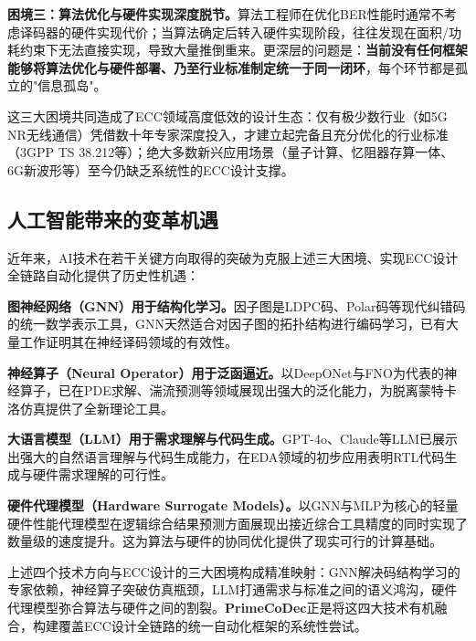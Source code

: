 \textbf{困境三：算法优化与硬件实现深度脱节。}算法工程师在优化BER性能时通常不考虑译码器的硬件实现代价；当算法确定后转入硬件实现阶段，往往发现在面积/功耗约束下无法直接实现，导致大量推倒重来。更深层的问题是：\textbf{当前没有任何框架能够将算法优化与硬件部署、乃至行业标准制定统一于同一闭环}，每个环节都是孤立的"信息孤岛"。

这三大困境共同造成了ECC领域高度低效的设计生态：仅有极少数行业（如5G NR无线通信）凭借数十年专家深度投入，才建立起完备且充分优化的行业标准（3GPP TS 38.212等\cite{3gpp38212}）；绝大多数新兴应用场景（量子计算、忆阻器存算一体、6G新波形等）至今仍缺乏系统性的ECC设计支撑。

\subsection{人工智能带来的变革机遇}\label{sec:ai_opportunity}

近年来，AI技术在若干关键方向取得的突破为克服上述三大困境、实现ECC设计全链路自动化提供了历史性机遇：

\textbf{图神经网络（GNN）用于结构化学习。}因子图是LDPC码、Polar码等现代纠错码的统一数学表示工具，GNN天然适合对因子图的拓扑结构进行编码学习，已有大量工作证明其在神经译码\cite{nachmani2018,kang2022}领域的有效性。

\textbf{神经算子（Neural Operator）用于泛函逼近。}以DeepONet\cite{lu2021}与FNO\cite{kovachki2023}为代表的神经算子，已在PDE求解、湍流预测等领域展现出强大的泛化能力，为脱离蒙特卡洛仿真提供了全新理论工具。

\textbf{大语言模型（LLM）用于需求理解与代码生成。}GPT-4o、Claude等LLM已展示出强大的自然语言理解与代码生成能力，在EDA领域的初步应用\cite{liu2023,chang2024}表明RTL代码生成与硬件需求理解的可行性。

\textbf{硬件代理模型（Hardware Surrogate Models）。}以GNN与MLP为核心的轻量硬件性能代理模型\cite{ustun2020,geng2021}在逻辑综合结果预测方面展现出接近综合工具精度的同时实现了数量级的速度提升。这为算法与硬件的协同优化提供了现实可行的计算基础。

上述四个技术方向与ECC设计的三大困境构成精准映射：GNN解决码结构学习的专家依赖，神经算子突破仿真瓶颈，LLM打通需求与标准之间的语义鸿沟，硬件代理模型弥合算法与硬件之间的割裂。\textbf{PrimeCoDec}正是将这四大技术有机融合，构建覆盖ECC设计全链路的统一自动化框架的系统性尝试。